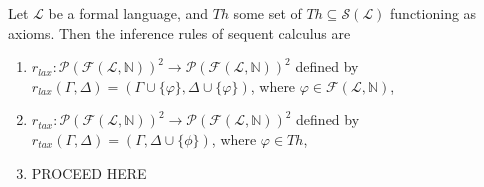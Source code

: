 \begin{definition}
    Let $\mathcal{L}$ be a formal language, and $Th$ some set of $Th \subseteq \mathcal{S}(\mathcal{L})$ functioning as axioms. Then the inference rules of sequent calculus are
    \begin{enumerate}
        \item $r_{lax} : \mathcal{P}(\mathcal{F}(\mathcal{L}, \mathbb{N}))^2 \to \mathcal{P}(\mathcal{F}(\mathcal{L},\mathbb{N}))^2$ defined by $r_{lax}(\Gamma,\Delta) = (\Gamma \cup \{\varphi\}, \Delta \cup \{\varphi\})$, where $\varphi \in \mathcal{F}(\mathcal{L},\mathbb{N})$,
        \item $r_{tax} : \mathcal{P}(\mathcal{F}(\mathcal{L}, \mathbb{N}))^2 \to \mathcal{P}(\mathcal{F}(\mathcal{L}, \mathbb{N}))^2$ defined by $r_{tax}(\Gamma, \Delta) = (\Gamma, \Delta \cup \{\phi\})$, where $\varphi \in Th$,
        \item PROCEED HERE          

    \end{enumerate}
\end{definition}

